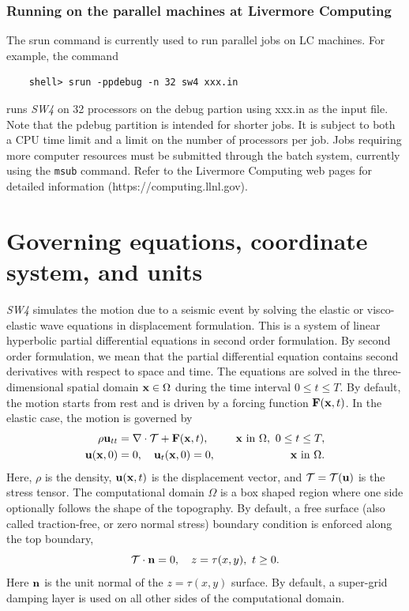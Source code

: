 \documentclass[11pt]{report}
\newcommand{\nb}{{\bf n}}
\begin{document}
\subsection{Running on the parallel machines at Livermore Computing}
%
The srun command is currently used to run parallel jobs on LC machines. For example, the command
\begin{verbatim}
	shell> srun -ppdebug -n 32 sw4 xxx.in
\end{verbatim}
runs \emph{SW4} on 32 processors on the debug partion using xxx.in as the input file. Note that the
pdebug partition is intended for shorter jobs. It is subject to both a CPU time limit and a limit on
the number of processors per job. Jobs requiring more computer resources must be submitted through
the batch system, currently using the \verb+msub+ command. Refer to the Livermore Computing web pages for
detailed information (https://computing.llnl.gov).



\chapter{Governing equations, coordinate system, and units}
%
\emph{SW4} simulates the motion due to a seismic event by solving the elastic or visco-elastic wave
equations in displacement formulation. This is a system of linear hyperbolic partial differential
equations in second order formulation. By second order formulation, we mean that the partial
differential equation contains second derivatives with respect to space and time. The equations
are solved in the three-dimensional spatial domain ${\bf x}\in\Omega$ during the time interval
$0\leq t\leq T$. By default, the motion starts from rest and is driven by a forcing function ${\bf
  F}({\bf x},t)$. In the elastic case, the motion is governed by
\begin{alignat}{3}
\rho {\bf u}_{tt} &= \nabla\cdot{\cal T} + {\bf F}({\bf x},t),&\quad\mbox{${\bf x}$ in
  $\Omega$},\ 0\leq t\leq T,\label{eq:elastic-we}\\ 
{\bf u}({\bf x},0)&=0,\quad {\bf u}_t({\bf x},0) = 0, &\quad\mbox{${\bf x}$ in $\Omega$}.
\end{alignat}
Here, $\rho$ is the density, ${\bf u}({\bf x},t)$ is the displacement vector, and ${\cal T}={\cal
  T}({\bf u})$ is the stress tensor. The computational domain $\Omega$ is a box shaped region where
one side optionally follows the shape of the topography. By default, a free surface (also called
traction-free, or zero normal stress) boundary condition is enforced along the top boundary,
\[
{\cal T} \cdot \nb = 0,\quad z=\tau(x,y),\ t\geq 0.
\]
Here $\nb$ is the unit normal of the $z=\tau(x,y)$ surface. By default, a super-grid damping layer
is used on all other sides of the computational domain.
\end{document}
